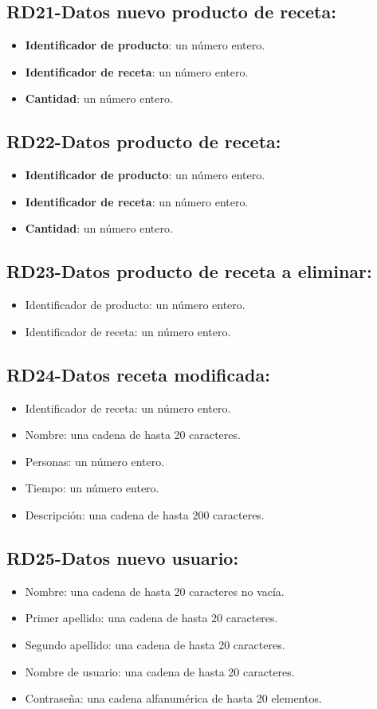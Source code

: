 \documentclass[a4paper,12pt]{report}
\begin{document}
\subsection{RD21-Datos nuevo producto de receta:}
\label{sec-2-1-21}
\begin{itemize}
\item \textbf{Identificador de producto}: un número entero.
\item \textbf{Identificador de receta}: un número entero.
\item \textbf{Cantidad}: un número entero.
\end{itemize}
\subsection{RD22-Datos producto de receta:}
\label{sec-2-1-22}
\begin{itemize}
\item \textbf{Identificador de producto}: un número entero.
\item \textbf{Identificador de receta}: un número entero.
\item \textbf{Cantidad}: un número entero.
\end{itemize}
\subsection{RD23-Datos producto de receta a eliminar:}
\label{sec-2-1-23}
\begin{itemize}
\item Identificador de producto: un número entero.
\item Identificador de receta: un número entero.
\end{itemize}
\subsection{RD24-Datos receta modificada:}
\label{sec-2-1-24}
\begin{itemize}
\item Identificador de receta: un número entero.
\item Nombre: una cadena de hasta 20 caracteres.
\item Personas: un número entero.
\item Tiempo: un número entero.
\item Descripción: una cadena de hasta 200 caracteres.
\end{itemize}
\subsection{RD25-Datos nuevo usuario:}
\label{sec-2-1-25}
\begin{itemize}
\item Nombre: una cadena de hasta 20 caracteres no vacía.
\item Primer apellido: una cadena de hasta 20 caracteres.
\item Segundo apellido: una cadena de hasta 20 caracteres.
\item Nombre de usuario: una cadena de hasta 20 caracteres.
\item Contraseña: una cadena alfanumérica de hasta 20 elementos.
\end{itemize}
\end{document}
